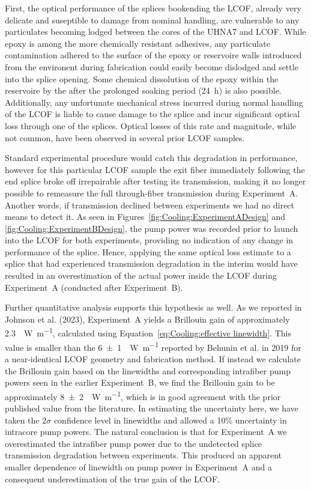First, the optical performance of the splices bookending the \ac{LCOF}, already very delicate and suseptible to damage from nominal handling, are vulnerable to any particulates becoming lodged between the cores of the \ac{UHNA7} and \ac{LCOF}. While epoxy is among the more chemically resistant adhesives, any particulate contamination adhered to the surface of the epoxy or reservoire walls introduced from the environent during fabrication could easily become dislodged and settle into the splice opening. Some chemical dissolution of the epoxy within the reservoire by the  after the prolonged soaking period (\SI{24}{\hour}) is also possible. Additionally, any unfortunate mechanical stress incurred during normal handling of the \ac{LCOF} is liable to cause damage to the splice and incur significant optical loss through one of the splices. Optical losses of this rate and magnitude, while not common, have been observed in several prior \ac{LCOF} samples.

Standard experimental procedure would catch this degradation in performance, however for this particular \ac{LCOF} sample the exit fiber immediately following the end splice broke off irrepairable after testing its transmission, making it no longer possible to remeasure the full through‐fiber transmission during Experiment~A. Another words, if transmission declined between experiments we had no direct means to detect it. As seen in Figures~\ref{fig:Cooling:ExperimentADesign} and \ref{fig:Cooling:ExperimentBDesign}, the pump power was recorded prior to launch into the \ac{LCOF} for both experiments, providing no indication of any change in performance of the splice. Hence, applying the same optical loss estimate to a splice that had experienced transmission degradation in the interim would have resulted in an overestimation of the actual power inside the \ac{LCOF} during Experiment~A (conducted after Experiment~B).

Further quantitative analysis supports this hypothesis as well. As we reported in Johnson et al. (2023)\cite{johnson2023laser}, Experiment~A yields a Brillouin gain of approximately \SI{2.3}{\per\watt\per\meter}, calculated using Equation~\ref{eq:Cooling:effective linewidth}. This value is smaller than the \SI{6(1)}{\per\watt\per\meter} reported by Behunin et al. in 2019\cite{behunin2019spontaneous} for a near‐identical \ac{LCOF} geometry and fabrication method. If instead we calculate the Brillouin gain based on the linewidths and corresponding intrafiber pump powers seen in the earlier Experiment~B, we find the Brillouin gain to be approximately \SI{8(2)}{\per\watt\per\meter}, which is in good agreement with the prior published value from the literature. In estimating the uncertainty here, we have taken the \(2\sigma\) confidence level in linewidths and allowed a 10\% uncertainty in intracore pump powers. The natural conclusion is that for Experiment~A we overestimated the intrafiber pump power due to the undetected splice transmission degradation between experiments. This produced an apparent smaller dependence of linewidth on pump power in Experiment~A and a consequent underestimation of the true gain of the \ac{LCOF}.

